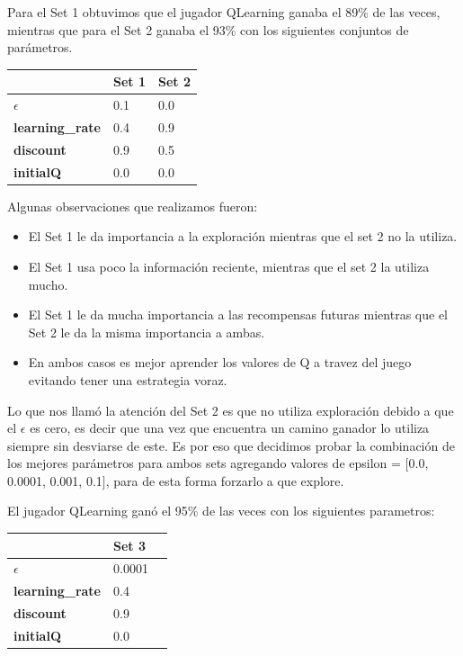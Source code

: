 Para el Set 1 obtuvimos que el jugador QLearning ganaba el 89\% de las veces, mientras que para el Set 2 ganaba el 93\% con los siguientes conjuntos de parámetros.

\begin{center}
    \begin{tabular}{| l | l | l |}
    \hline
     					    &  \textbf{Set 1} & \textbf{Set 2} \\ \hline
    \textbf{$\epsilon$}     &  0.1   		  & 0.0   \\
    \textbf{learning\_rate} &  0.4   		  & 0.9   \\
    \textbf{discount}       &  0.9  		  & 0.5   \\
	\textbf{initialQ} 		&  0.0   		  & 0.0   \\
    \hline
    \end{tabular}
\end{center}

Algunas observaciones que realizamos fueron:
\begin{itemize}
\item El Set 1 le da importancia a la exploración mientras que el set 2 no la utiliza.
\item El Set 1 usa poco la información reciente, mientras que el set 2 la utiliza mucho.
\item El Set 1 le da mucha importancia a las recompensas futuras mientras que el Set 2 le da la misma importancia a ambas.
\item En ambos casos es mejor aprender los valores de Q a travez del juego evitando tener una estrategia voraz.
\end{itemize}

Lo que nos llamó la atención del Set 2 es que no utiliza exploración debido a que el $\epsilon$ es cero, es decir que una vez que encuentra un camino ganador lo utiliza siempre sin desviarse de este.
Es por eso que decidimos probar la combinación de los mejores parámetros para ambos sets agregando valores de epsilon = $[$0.0, 0.0001, 0.001, 0.1$]$, para de esta forma forzarlo a que explore.

El jugador QLearning ganó el 95\% de las veces con los siguientes parametros:
\begin{center}
    \begin{tabular}{| l | l | l |}
    \hline
     					    &  \textbf{Set 3} \\ \hline
    \textbf{$\epsilon$}     &  0.0001  		  \\
    \textbf{learning\_rate} &  0.4   		  \\
    \textbf{discount}       &  0.9  		  \\
	\textbf{initialQ} 		&  0.0   		  \\
    \hline
    \end{tabular}
\end{center}


